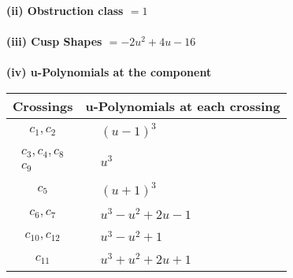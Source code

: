 \documentclass[1p]{elsarticle_modified}
\theoremstyle{definition}
\begin{document}
\flushleft \textbf{(ii) Obstruction class $= 1$}\\~\\
\flushleft \textbf{(iii) Cusp Shapes $= -2 u^2+4 u-16$}\\~\\
\newpage\renewcommand{\arraystretch}{1}
\flushleft \textbf{(iv) u-Polynomials at the component}\newline \\
\begin{tabular}{m{50pt}|m{274pt}}
Crossings & \hspace{64pt}u-Polynomials at each crossing \\
\hline $$\begin{aligned}c_{1},c_{2}\end{aligned}$$&$\begin{aligned}
&(u-1)^3
\end{aligned}$\\
\hline $$\begin{aligned}c_{3},c_{4},c_{8}\\c_{9}\end{aligned}$$&$\begin{aligned}
&u^3
\end{aligned}$\\
\hline $$\begin{aligned}c_{5}\end{aligned}$$&$\begin{aligned}
&(u+1)^3
\end{aligned}$\\
\hline $$\begin{aligned}c_{6},c_{7}\end{aligned}$$&$\begin{aligned}
&u^3- u^2+2 u-1
\end{aligned}$\\
\hline $$\begin{aligned}c_{10},c_{12}\end{aligned}$$&$\begin{aligned}
&u^3- u^2+1
\end{aligned}$\\
\hline $$\begin{aligned}c_{11}\end{aligned}$$&$\begin{aligned}
&u^3+u^2+2 u+1
\end{aligned}$\\
\hline
\end{tabular}\\~\\
\end{document}
